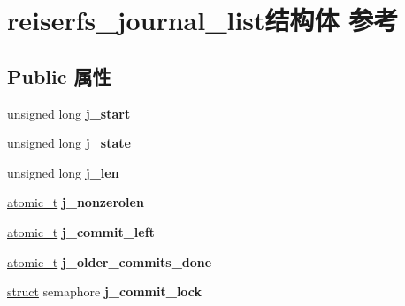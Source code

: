 \hypertarget{structreiserfs__journal__list}{}\section{reiserfs\+\_\+journal\+\_\+list结构体 参考}
\label{structreiserfs__journal__list}
\subsection*{Public 属性}
\begin{DoxyCompactItemize}
\item 
\mbox{\label{structreiserfs__journal__list_a4ced38506f62d32a5e1f20f0303fc1ad}} 
unsigned long {\bfseries j\+\_\+start}
\item 
\mbox{\label{structreiserfs__journal__list_a828da12b70cae73d79902525dfa598ab}} 
unsigned long {\bfseries j\+\_\+state}
\item 
\mbox{\label{structreiserfs__journal__list_a356f0500bbf8db47380ec8883e393095}} 
unsigned long {\bfseries j\+\_\+len}
\item 
\mbox{\label{structreiserfs__journal__list_ad4407cbd60265908d2c96e94e9e310b6}} 
\hyperlink{structatomic__t}{atomic\+\_\+t} {\bfseries j\+\_\+nonzerolen}
\item 
\mbox{\label{structreiserfs__journal__list_a62cc70db692abb27f2b0c4a2e2bed268}} 
\hyperlink{structatomic__t}{atomic\+\_\+t} {\bfseries j\+\_\+commit\+\_\+left}
\item 
\mbox{\label{structreiserfs__journal__list_ad5da045675f31d561963819993f650f8}} 
\hyperlink{structatomic__t}{atomic\+\_\+t} {\bfseries j\+\_\+older\+\_\+commits\+\_\+done}
\item 
\mbox{\label{structreiserfs__journal__list_aa2419e2002ee540add5b4dafb66487f2}} 
\hyperlink{interfacestruct}{struct} semaphore {\bfseries j\+\_\+commit\+\_\+lock}
\item 
\mbox{\label{structreiserfs__journal__list_ab5d39b0e027a1c2a6168c366cfaee48e}} 

\end{DoxyCompactItemize}
